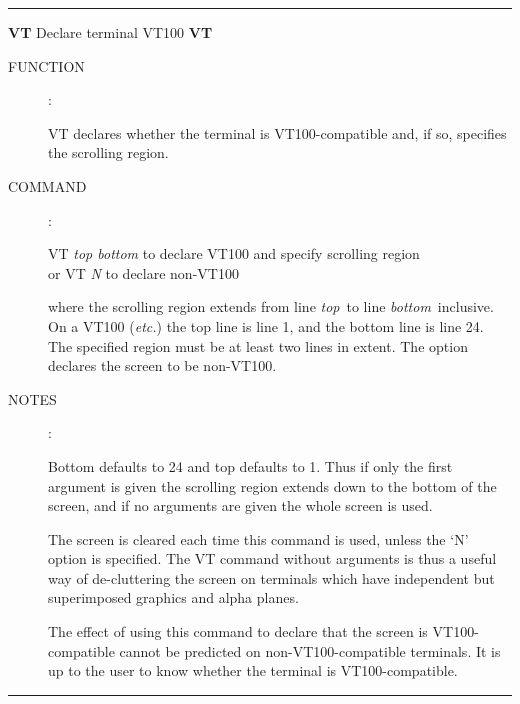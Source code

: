 
\goodbreak
\rule{\textwidth}{0.3mm}
{\Large {\bf VT} \hfill Declare terminal VT100 \hfill {\bf VT}}
\begin{description}
\item [FUNCTION]:

VT declares whether the terminal is VT100-compatible and, if so,
specifies the scrolling region.

\item [COMMAND]:

\begin{cmd}
\> \> VT {\it top bottom} \> to declare VT100 and specify scrolling region \\
\> or \> VT {\it N} \> to declare non-VT100
\end{cmd}

where the scrolling region extends from line
{\it top}\, to line {\it bottom}\,
inclusive.  On a VT100 ({\it etc.}) the top line is line 1, and the bottom
line is line 24.  The specified region must be at least two lines
in extent.  The  option declares the screen to be
non-VT100.

\item [NOTES]:

Bottom defaults to 24 and top defaults to 1.  Thus if only the
first argument is given the scrolling region extends down to the
bottom of the screen, and if no arguments are given the whole
screen is used.

The screen is cleared each time this command is used, unless the
`N' option is specified.  The VT command without arguments is thus
a useful way of de-cluttering the screen on terminals which have
independent but superimposed graphics and alpha planes.

The effect of using this command to declare that the screen is
VT100-compatible cannot be predicted on
non-VT100-compatible terminals.  It is up to the user
to know whether the terminal is VT100-compatible.

\end{description}
\rule{\textwidth}{0.3mm}


